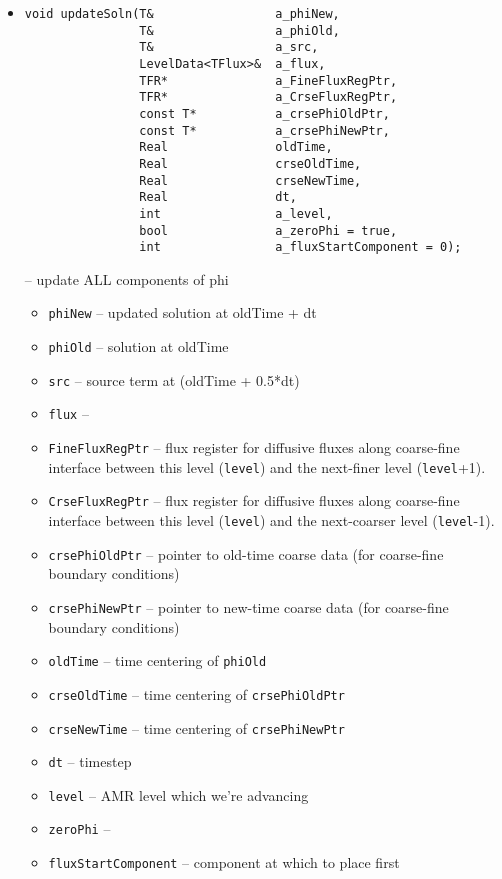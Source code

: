 \begin{itemize}
\item
\begin{verbatim}
void updateSoln(T&                 a_phiNew,
                T&                 a_phiOld,
                T&                 a_src,
                LevelData<TFlux>&  a_flux,
                TFR*               a_FineFluxRegPtr,
                TFR*               a_CrseFluxRegPtr,
                const T*           a_crsePhiOldPtr,
                const T*           a_crsePhiNewPtr,
                Real               oldTime,
                Real               crseOldTime,
                Real               crseNewTime,
                Real               dt,
                int                a_level,
                bool               a_zeroPhi = true,
                int                a_fluxStartComponent = 0);
\end{verbatim}
-- update ALL components of phi
\begin{itemize}
\item {\tt phiNew} -- updated solution at oldTime + dt
\item {\tt phiOld} -- solution at oldTime
\item {\tt src} -- source term at (oldTime + 0.5*dt)
\item {\tt flux} -- 
\item {\tt FineFluxRegPtr} -- flux register for diffusive fluxes
  along coarse-fine interface between this level ({\tt level}) and the
  next-finer level ({\tt level}+1).
\item {\tt CrseFluxRegPtr} -- flux register for diffusive fluxes
  along coarse-fine interface between this level ({\tt level}) and the
  next-coarser level ({\tt level}-1).
\item {\tt crsePhiOldPtr} -- pointer to old-time coarse data (for
  coarse-fine boundary conditions)
\item {\tt crsePhiNewPtr} -- pointer to new-time coarse data (for
  coarse-fine boundary conditions)
\item {\tt oldTime} -- time centering of {\tt phiOld}
\item {\tt crseOldTime} -- time centering of {\tt crsePhiOldPtr}
\item {\tt crseNewTime} -- time centering of {\tt crsePhiNewPtr}
\item {\tt dt} -- timestep
\item {\tt level} -- AMR level which we're advancing
\item {\tt zeroPhi} -- 
\item {\tt fluxStartComponent} -- component at which to place first

\end{itemize}
\end{itemize}
